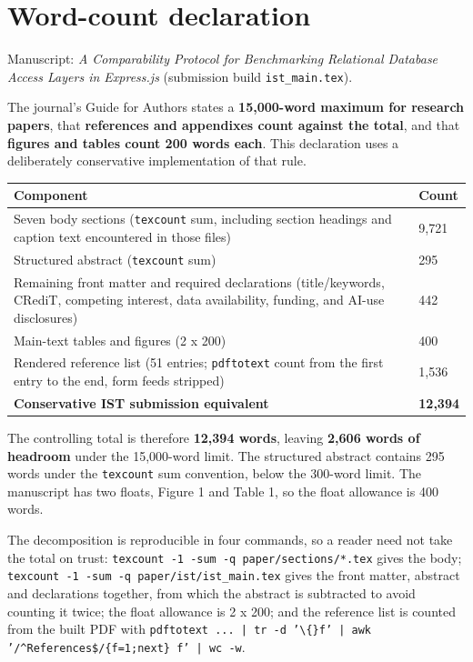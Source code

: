 \documentclass[11pt,a4paper]{article}
\begin{document}
\section*{Word-count declaration}

Manuscript: \emph{A Comparability Protocol for Benchmarking Relational Database Access Layers in Express.js} (submission build \texttt{ist\_main.tex}).

The journal's Guide for Authors states a \textbf{15,000-word maximum for research papers}, that \textbf{references and appendixes count against the total}, and that \textbf{figures and tables count 200 words each}. This declaration uses a deliberately conservative implementation of that rule.

\begin{center}\begin{tabular}{ll}
\hline
Component & Count \\
\hline
Seven body sections (\texttt{texcount} sum, including section headings and caption text encountered in those files) & 9,721 \\
Structured abstract (\texttt{texcount} sum) & 295 \\
Remaining front matter and required declarations (title/keywords, CRediT, competing interest, data availability, funding, and AI-use disclosures) & 442 \\
Main-text tables and figures (2 x 200) & 400 \\
Rendered reference list (51 entries; \texttt{pdftotext} count from the first entry to the end, form feeds stripped) & 1,536 \\
\textbf{Conservative IST submission equivalent} & \textbf{12,394} \\
\hline
\end{tabular}\end{center}

The controlling total is therefore \textbf{12,394 words}, leaving \textbf{2,606 words of headroom} under the 15,000-word limit. The structured abstract contains 295 words under the \texttt{texcount} sum convention, below the 300-word limit. The manuscript has two floats, Figure 1 and Table 1, so the float allowance is 400 words.

The decomposition is reproducible in four commands, so a reader need not take the total on trust: \texttt{texcount -1 -sum -q paper/sections/*.tex} gives the body; \texttt{texcount -1 -sum -q paper/ist/ist\_main.tex} gives the front matter, abstract and declarations together, from which the abstract is subtracted to avoid counting it twice; the float allowance is 2 x 200; and the reference list is counted from the built PDF with \texttt{pdftotext ... | tr -d '\textbackslash\{\}f' | awk '/\textasciicircum{}References\$/\{f=1;next\} f' | wc -w}.
\end{document}
